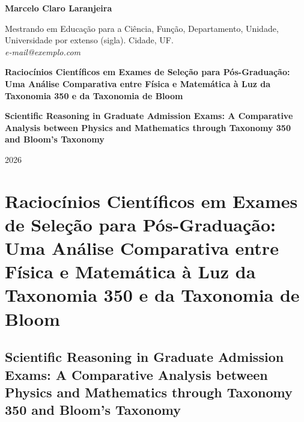 \documentclass[
  12pt,
  a4paper,
  twoside,
  brazilian
]{article}
\begin{document}
\begin{titlepage}
  \begin{center}
    \vspace*{3cm}
    {\large\bfseries Marcelo Claro Laranjeira\par}
    \vspace{0.5cm}
    {\normalsize \lbrack Mestrando em Educação para a Ciência\rbrack, \lbrack Função\rbrack,
    \lbrack Departamento\rbrack, \lbrack Unidade\rbrack, \\
    \lbrack Universidade por extenso (sigla)\rbrack. \lbrack Cidade\rbrack, \lbrack UF\rbrack. \\
    \textit{\lbrack e-mail@exemplo.com\rbrack}\par}
    \vspace{3cm}
    {\LARGE\bfseries Raciocínios Científicos em Exames de Seleção para Pós-Graduação: Uma Análise Comparativa entre Física e Matemática à Luz da Taxonomia 350 e da Taxonomia de Bloom\par}
    \vspace{0.5cm}
    {\large\bfseries Scientific Reasoning in Graduate Admission Exams: A Comparative Analysis between Physics and Mathematics through Taxonomy 350 and Bloom's Taxonomy\par}
    \vfill
    {\large 2026\par}
  \end{center}
\end{titlepage}

\clearpage
{}
\tableofcontents
\newpage

\section{Raciocínios Científicos em Exames de Seleção para
Pós-Graduação: Uma Análise Comparativa entre Física e Matemática à Luz
da Taxonomia 350 e da Taxonomia de
Bloom}\label{raciocuxednios-cientuxedficos-em-exames-de-seleuxe7uxe3o-para-puxf3s-graduauxe7uxe3o-uma-anuxe1lise-comparativa-entre-fuxedsica-e-matemuxe1tica-uxe0-luz-da-taxonomia-350-e-da-taxonomia-de-bloom}

\subsection{Scientific Reasoning in Graduate Admission Exams: A
Comparative Analysis between Physics and Mathematics through Taxonomy
350 and Bloom's
Taxonomy}\label{scientific-reasoning-in-graduate-admission-exams-a-comparative-analysis-between-physics-and-mathematics-through-taxonomy-350-and-blooms-taxonomy}
\end{document}
